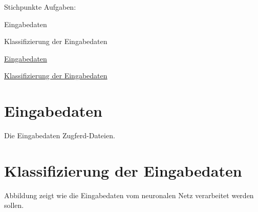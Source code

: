 Stichpunkte Aufgaben\-:
\begin{DoxyEnumerate}
\item Eingabedaten
\item Klassifizierung der Eingabedaten
\end{DoxyEnumerate}

\hyperlink{Eingabedaten}{Eingabedaten} \par
\hyperlink{Klassifizierung}{Klassifizierung der Eingabedaten} \par
\hypertarget{Eingabedaten}{}\section{Eingabedaten}\label{Eingabedaten}
Die Eingabedaten Zugferd-\/\-Dateien. \hypertarget{Klassifizierung}{}\section{Klassifizierung der Eingabedaten}\label{Klassifizierung}
Abbildung zeigt wie die Eingabedaten vom neuronalen Netz verarbeitet werden sollen. 